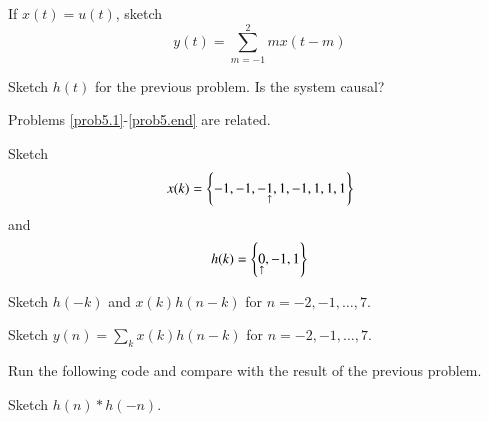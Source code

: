 \documentclass[journal,12pt,twocolumn]{IEEEtran}
\begin{document}
\begin{problem}
\label{prob4.1}
If $x(t) = u(t)$, sketch
\begin{equation}
y(t) = \sum_{m=-1}^{2}mx(t-m)
\end{equation}
%
\end{problem}
%
\begin{problem}
\label{prob4.end}
Sketch $h(t)$ for the previous problem.  Is the system causal?
\end{problem}
%
Problems \ref{prob5.1}-\ref{prob5.end} are related.
\begin{problem}
\label{prob5.1}
Sketch
\begin{equation}
x(k) = \left\{-1,-1,-\underset{\uparrow}{1},1,-1,1,1,1\right\}
\end{equation}
and
\begin{equation}
h(k) = \left\{\underset{\uparrow}{0},-1,1\right\}
\end{equation}
\end{problem}
%
\begin{problem}
Sketch $h(-k)$ and $x(k)h(n-k)$ for $n = -2,-1, \dots,7 $.
\end{problem}
%
\begin{problem}
Sketch  $y(n) = \sum_{k}x(k)h(n-k)$ for $n = -2,-1, \dots,7 $.
\end{problem}
%
\begin{problem}
Run the following code and compare with the result of the previous problem.

\end{problem}
%
\begin{problem}
\label{prob5.end}
Sketch $h(n)*h(-n)$.
\end{problem}
%


\end{document}
